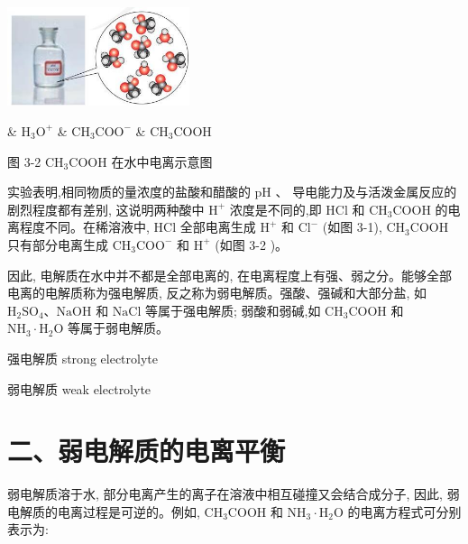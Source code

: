 \documentclass[10pt]{article}
\begin{document}
\begin{center}
\includegraphics[max width=0.4\textwidth]{images/0190da9d-8bfd-732f-bc2c-0b21d0f13b91_63_453205.jpg}
\end{center}

\& \({\mathrm{H}}_{3}{\mathrm{O}}^{ + }\) \& \({\mathrm{{CH}}}_{3}{\mathrm{{COO}}}^{ - }\) \& \({\mathrm{{CH}}}_{3}\mathrm{{COOH}}\)

图 3-2 \({\mathrm{{CH}}}_{3}\mathrm{{COOH}}\) 在水中电离示意图

实验表明,相同物质的量浓度的盐酸和醋酸的 \(\mathrm{{pH}}\) 、 导电能力及与活泼金属反应的剧烈程度都有差别, 这说明两种酸中 \({\mathrm{H}}^{ + }\) 浓度是不同的,即 \(\mathrm{{HCl}}\) 和 \({\mathrm{{CH}}}_{3}\mathrm{{COOH}}\) 的电离程度不同。在稀溶液中, \(\mathrm{{HCl}}\) 全部电离生成 \({\mathrm{H}}^{ + }\) 和 \({\mathrm{{Cl}}}^{ - }\) (如图 3-1), \({\mathrm{{CH}}}_{3}\mathrm{{COOH}}\) 只有部分电离生成 \({\mathrm{{CH}}}_{3}{\mathrm{{COO}}}^{ - }\) 和 \({\mathrm{H}}^{ + }\) (如图 3-2 )。

因此, 电解质在水中并不都是全部电离的, 在电离程度上有强、弱之分。能够全部电离的电解质称为强电解质, 反之称为弱电解质。强酸、强碱和大部分盐, 如 \({\mathrm{H}}_{2}{\mathrm{{SO}}}_{4}\text{、}\mathrm{{NaOH}}\) 和 \(\mathrm{{NaCl}}\) 等属于强电解质; 弱酸和弱碱,如 \({\mathrm{{CH}}}_{3}\mathrm{{COOH}}\) 和 \({\mathrm{{NH}}}_{3} \cdot {\mathrm{H}}_{2}\mathrm{O}\) 等属于弱电解质。

\begin{mdframed}

强电解质 strong electrolyte

弱电解质 weak electrolyte

\end{mdframed}

\section*{二、弱电解质的电离平衡}

弱电解质溶于水, 部分电离产生的离子在溶液中相互碰撞又会结合成分子, 因此, 弱电解质的电离过程是可逆的。例如, \({\mathrm{{CH}}}_{3}\mathrm{{COOH}}\) 和 \({\mathrm{{NH}}}_{3} \cdot {\mathrm{H}}_{2}\mathrm{O}\) 的电离方程式可分别表示为:
\end{document}

